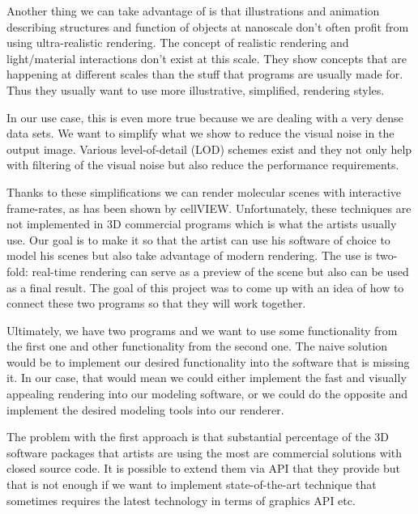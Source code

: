 \documentclass[
  digital, %
  table,   %
  nolof,     %
  nolot,     %
]{fithesis3}
\begin{document}
Another thing we can take advantage of is that illustrations and animation describing structures and function of objects at nanoscale don't often profit from using ultra-realistic rendering. The concept of realistic rendering and light/material interactions don't exist at this scale. They show concepts that are happening at different scales than the stuff that programs are usually made for. Thus they usually want to use more illustrative, simplified, rendering styles.

In our use case, this is even more true because we are dealing with a very dense data sets. We want to simplify what we show to reduce the visual noise in the output image. Various level-of-detail (LOD) schemes exist and they not only help with filtering of the visual noise but also reduce the performance requirements.

Thanks to these simplifications we can render molecular scenes with interactive frame-rates, as has been shown by cellVIEW\cite{cellVIEW_2015}. Unfortunately, these techniques are not implemented in 3D commercial programs which is what the artists usually use. Our goal is to make it so that the artist can use his software of choice to model his scenes but also take advantage of modern rendering. The use is two-fold: real-time rendering can serve as a preview of the scene but also can be used as a final result. The goal of this project was to come up with an idea of how to connect these two programs so that they will work together.

Ultimately, we have two programs and we want to use some functionality from the first one and other functionality from the second one. The naive solution would be to implement our desired functionality into the software that is missing it. In our case, that would mean we could either implement the fast and visually appealing rendering into our modeling software, or we could do the opposite and implement the desired modeling tools into our renderer.

The problem with the first approach is that substantial percentage of the 3D software packages that artists are using the most are commercial solutions with closed source code. It is possible to extend them via API that they provide but that is not enough if we want to implement state-of-the-art technique that sometimes requires the latest technology in terms of graphics API etc.
\end{document}
